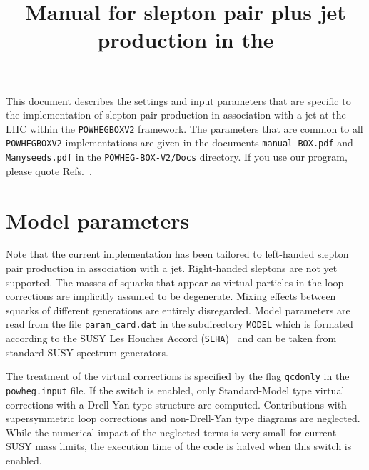 \documentclass[a4paper,11pt]{article}
\title{Manual for slepton pair plus jet production in the \POWHEGBOXvTWO{}}
\date{}
\author{}
\newcommand\POWHEGBOXvTWO{{\tt POWHEG\;BOX\;V2}}
\begin{document}
\maketitle
%
\noindent
This document describes the settings and input parameters that are specific to
the implementation of slepton pair production in association with a jet at the LHC within the
\POWHEGBOXvTWO{} framework. 
%
The parameters that are common to all \POWHEGBOXvTWO{} implementations are given in
the documents {\tt manual-BOX.pdf} and {\tt Manyseeds.pdf}
in the {\tt POWHEG-BOX-V2/Docs} directory.
%
If you use our program, please quote
Refs.~\cite{JMT,Alioli:2010xd,Ellis:2007qk,vanOldenborgh:1990yc}.

\section*{Model parameters}
%
Note that the current  implementation has been tailored to 
left-handed slepton pair production in association with a jet. Right-handed sleptons are not yet supported. The masses of squarks that appear as virtual particles in the loop corrections are implicitly assumed to be degenerate. Mixing effects between squarks of different generations are entirely disregarded. 
%
Model parameters are read from the file {\tt param\_card.dat}
in the subdirectory {\tt MODEL} which is formated 
according to the SUSY Les Houches Accord ({\tt SLHA})~\cite{Skands:2003cj,Allanach:2008qq}
and can be taken from standard SUSY spectrum generators.

The treatment of the virtual corrections is specified by the flag {\tt qcdonly} in the  {\tt powheg.input} file. If the switch is enabled, only Standard-Model type virtual corrections with a Drell-Yan-type structure are computed. Contributions with supersymmetric loop corrections and non-Drell-Yan type diagrams are neglected. 
While the numerical impact of the
neglected terms is very small for
current SUSY mass limits,
the execution time of the code is halved
when this switch is enabled.
\end{document}
